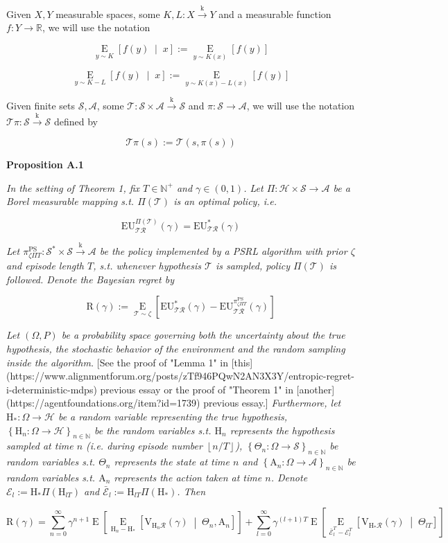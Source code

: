 \documentclass[a4paper]{article}
\newcommand{\Co}[1]{}
\newcommand{\AP}[1]{\left(#1\right)}
\newcommand{\AB}[1]{\left[#1\right]}
\newcommand{\AC}[1]{\left\{#1\right\}}
\newcommand{\ABM}[2]{\left[#1\;\middle\vert\;#2\right]}
\newcommand{\Ea}[2]{\underset{#1}{\operatorname{E}}\AB{#2}}
\newcommand{\CE}[3]{\underset{#1}{\operatorname{E}}\ABM{#2}{#3}}
\newcommand{\Nats}{\mathbb{N}}
\newcommand{\Reals}{\mathbb{R}}
\newcommand{\Floor}[1]{\left\lfloor #1 \right\rfloor}
\newcommand{\K}{\xrightarrow{\mathrm{k}}}
\newcommand{\St}{\mathcal{S}}
\newcommand{\A}{\mathcal{A}}
\newcommand{\R}{\mathcal{R}}
\newcommand{\T}{\mathcal{T}}
\newcommand{\Hy}{\mathcal{H}}
\newcommand{\V}{\mathrm{V}}
\newcommand{\EU}{\mathrm{EU}}
\newcommand{\Reg}{\mathrm{R}}
\newcommand{\PSR}{\text{PS}}
\newcommand{\AT}{\mathrm{A}}
\newcommand{\THy}{\mathrm{H}_*}
\newcommand{\SHy}{\mathrm{H}}
\newcommand{\Ev}{\mathcal{E}}
\begin{document}
Given $X,Y$ measurable spaces, some $K,L:X\K Y$ and a measurable function $f:Y\rightarrow\Reals$, we will use the notation

$$\CE{y\sim K}{f(y)}{x}:=\Ea{y\sim K(x)}{f(y)}$$

$$\CE{y\sim K-L}{f(y)}{x}:=\Ea{y\sim K(x)-L(x)}{f(y)}$$

Given finite sets $\St,\A$, some $\T:\St\times\A\K\St$ and $\pi:\St\rightarrow\A$, we will use the notation $\T\pi:\St\K\St$ defined by

$$\T\pi(s):=\T\AP{s,\pi(s)}$$

\textbf{Proposition A.1}\Co{b}

\textit{In the setting of Theorem 1, fix $T\in\Nats^+$ and $\gamma\in(0,1)$. Let $\Pi:\Hy\times\St\rightarrow\A$ be a Borel measurable mapping s.t. $\Pi(\T)$ is an optimal policy, i.e.}\Co{i}

$$\EU^{\Pi(\T)}_{\T\R}(\gamma)=\EU^{*}_{\T\R}(\gamma)$$

\textit{Let $\pi_{\zeta\Pi T}^{\PSR}: \St^*\times\St\K\A$ be the policy implemented by a PSRL algorithm with prior $\zeta$ and episode length $T$, s.t. whenever hypothesis $\T$ is sampled, policy $\Pi(\T)$ is followed. Denote the Bayesian regret by}\Co{i}

$$\Reg(\gamma):=\Ea{\T\sim\zeta}{\EU^*_{\T\R}(\gamma)-\EU^{\pi_{\zeta\Pi T}^{\PSR}}_{\T\R}(\gamma)}$$

\textit{Let $(\Omega,P)$ be a probability space governing both the uncertainty about the true hypothesis, the stochastic behavior of the environment and the random sampling inside the algorithm.}\Co{i} [See the proof of "Lemma 1" in [this](https://www.alignmentforum.org/posts/zTf946PQwN2AN3X3Y/entropic-regret-i-deterministic-mdps) previous essay or the proof of "Theorem 1" in [another](https://agentfoundations.org/item?id=1739) previous essay.]\textit{ Furthermore, let $\THy:\Omega\rightarrow\Hy$ be a random variable representing the true hypothesis, $\AC{\SHy_n:\Omega\rightarrow\Hy}_{n\in\Nats}$ be the random variables s.t. $\SHy_n$ represents the hypothesis sampled at time $n$ (i.e. during episode number $\Floor{n/T}$), $\AC{\Theta_n:\Omega\rightarrow\St}_{n\in\Nats}$ be random variables s.t. $\Theta_n$ represents the state at time $n$ and $\AC{\AT_n:\Omega\rightarrow\A}_{n\in\Nats}$ be random variables s.t. $\AT_n$ represents the action taken at time $n$. Denote $\Ev_l:=\SHy_*\Pi\AP{\SHy_{lT}}$ and $\bar{\Ev}_l:=\SHy_{lT}\Pi\AP{\SHy_*}$. Then}\Co{i}

$$\Reg(\gamma)=\sum_{n=0}^\infty\gamma^{n+1}\Ea{}{\CE{\SHy_n-\THy}{\V_{\SHy_n\R}(\gamma)}{\Theta_n,\AT_n}}+\sum_{l=0}^\infty{\gamma^{(l+1)T}}\Ea{}{\CE{\bar{\Ev}_{l}^T-\Ev_{l}^T}{\V_{\SHy_*\R}(\gamma)}{\Theta_{lT}}}$$
\end{document}
